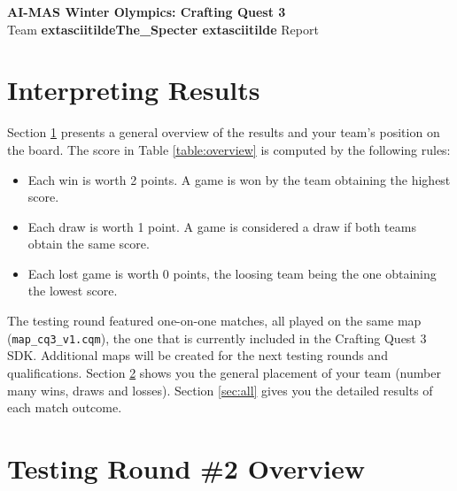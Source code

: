 \documentclass[a4paper,12pt]{article}
\begin{document}
\begin{center}
  {\huge \textbf{AI-MAS Winter Olympics: Crafting Quest 3}} \\
  {\huge Team \textbf{ 	extasciitildeThe\_Specter	extasciitilde } Report}
\end{center}


\section{Interpreting Results}
\label{sec:overview}

\par Section \ref{sec:overview} presents a general overview of the
results and your team's position on the board. The score in Table
\ref{table:overview} is computed by the following rules:
\begin{itemize}
\item Each win is worth 2 points. A game is won by the team obtaining
  the highest score.
\item Each draw is worth 1 point. A game is considered a draw if both
  teams obtain the same score.
\item Each lost game is worth 0 points, the loosing team being the one
  obtaining the lowest score.
\end{itemize}

The testing round featured one-on-one matches, all played on the same
map (\verb|map_cq3_v1.cqm|), the one that is currently included in the
Crafting Quest 3 SDK. Additional maps will be created for the next
testing rounds and qualifications.  Section \ref{sec:general} shows
you the general placement of your team (number many wins, draws and
losses).  Section \ref{sec:all} gives you the detailed results of each
match outcome.

\section{Testing Round \#2 Overview}
\label{sec:general}
\end{document}
